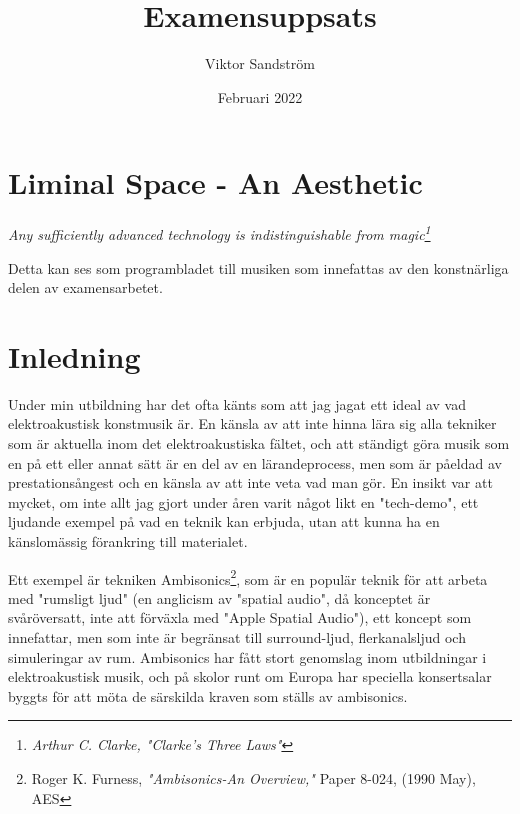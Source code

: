 \documentclass{article}
\begin{document}

\title{Examensuppsats}
\author{Viktor Sandström}
\date{Februari 2022}


\section{Liminal Space - An Aesthetic}

\emph{Any sufficiently advanced technology is indistinguishable from magic\footnote{\emph{Arthur C. Clarke, "Clarke's Three Laws"}}}
\linebreak

Detta kan ses som programbladet till musiken som innefattas av den konstnärliga delen av examensarbetet.

\section{Inledning}
Under min utbildning har det ofta känts som att jag jagat ett ideal av vad elektroakustisk konstmusik är. En
känsla av att inte hinna lära sig alla tekniker som är aktuella inom det elektroakustiska fältet, och att
ständigt göra musik som en på ett eller annat sätt är en del av en lärandeprocess, men som är påeldad av
prestationsångest och en känsla av att inte veta vad man gör. En insikt var att mycket, om inte allt jag gjort
under åren varit något likt en "tech-demo", ett ljudande exempel på vad en teknik kan erbjuda, utan att kunna
ha en känslomässig förankring till materialet. 

Ett exempel är tekniken Ambisonics\footnote{Roger K. Furness, \emph{"Ambisonics-An Overview,"} Paper 8-024,
(1990 May), AES}, som är en populär teknik för att arbeta med "rumsligt ljud" (en anglicism av "spatial
audio", då konceptet är svåröversatt, inte att förväxla med "Apple Spatial Audio"), ett koncept som
innefattar, men som inte är begränsat till surround-ljud, flerkanalsljud och simuleringar av rum. Ambisonics
har fått stort genomslag inom utbildningar i elektroakustisk musik, och på skolor runt om Europa har speciella
konsertsalar byggts för att möta de särskilda kraven som ställs av ambisonics. 
\end{document}
